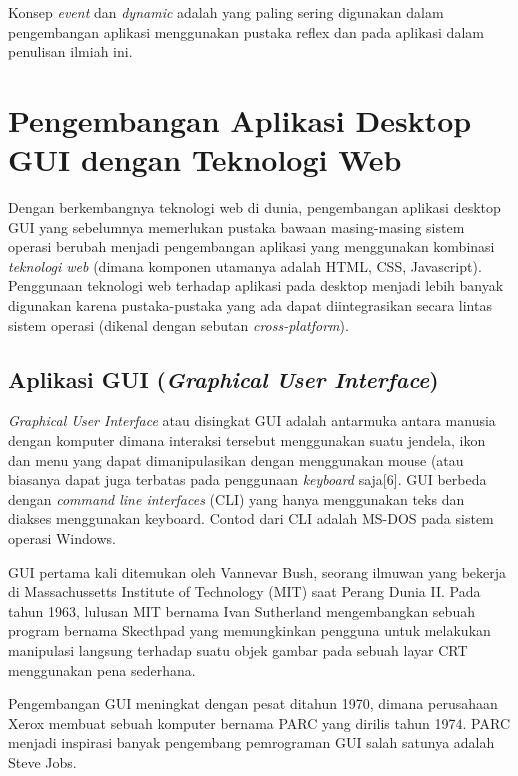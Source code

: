 \documentclass[pi.tex]{subfile}
\begin{document}
\hspace{5pt}Konsep \emph{event} dan \emph{dynamic} adalah yang paling sering digunakan dalam pengembangan aplikasi menggunakan pustaka reflex dan pada aplikasi dalam penulisan ilmiah ini.

\section{Pengembangan Aplikasi Desktop GUI dengan Teknologi Web}
Dengan berkembangnya teknologi web di dunia, pengembangan aplikasi desktop GUI yang sebelumnya memerlukan pustaka bawaan masing-masing sistem operasi berubah menjadi pengembangan aplikasi yang menggunakan kombinasi \emph{teknologi web} (dimana komponen utamanya adalah HTML, CSS, Javascript). Penggunaan teknologi web terhadap aplikasi pada desktop menjadi lebih banyak digunakan karena pustaka-pustaka yang ada dapat diintegrasikan secara lintas sistem operasi (dikenal dengan sebutan \emph{cross-platform}).

\subsection{Aplikasi GUI (\emph{Graphical User Interface})}\hspace{5pt}
\emph{Graphical User Interface} atau disingkat GUI adalah antarmuka antara manusia dengan komputer dimana interaksi tersebut menggunakan suatu jendela, ikon dan menu yang dapat dimanipulasikan dengan menggunakan mouse (atau biasanya dapat juga terbatas pada penggunaan \emph{keyboard} saja[6]. GUI berbeda dengan \emph{command line interfaces} (CLI) yang hanya menggunakan teks dan diakses menggunakan keyboard. Contod dari CLI adalah MS-DOS pada sistem operasi Windows.

\hspace{5pt}GUI pertama kali ditemukan oleh Vannevar Bush, seorang ilmuwan yang bekerja di Massachussetts Institute of Technology (MIT) saat Perang Dunia II. Pada tahun 1963, lulusan MIT bernama Ivan Sutherland mengembangkan sebuah program bernama Skecthpad yang memungkinkan pengguna untuk melakukan manipulasi langsung terhadap suatu objek gambar pada sebuah layar CRT menggunakan pena sederhana.

\hspace{5pt}Pengembangan GUI meningkat dengan pesat ditahun 1970, dimana perusahaan Xerox membuat sebuah komputer bernama PARC yang dirilis tahun 1974. PARC menjadi inspirasi banyak pengembang pemrograman GUI salah satunya adalah Steve Jobs.
\end{document}
